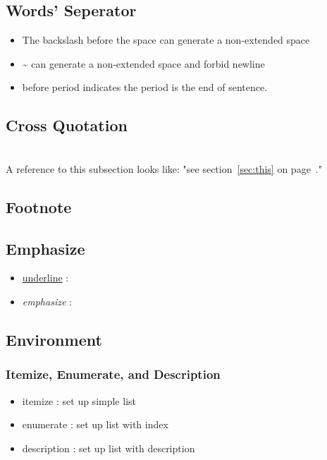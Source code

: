 \documentclass{article}
\begin{document}
\subsection{Words' Seperator}
\begin{itemize}
    \item The backslash before the space can
    generate a non-extended space 
    \item \~{} can generate a non-extended space
    and forbid newline
    \item {} before period
    indicates the period is the end of sentence.
\end{itemize}

\subsection{Cross Quotation}
\\
A reference to this subsection \label{sec:this}
looks like: "see section~\ref{sec:this} on
page~\pageref{sec:this}."

\subsection{Footnote}

\subsection{Emphasize}

\begin{itemize}
    \item \underline{underline}{} : 
    \item \emph{emphasize}{} : 
\end{itemize}

\subsection{Environment}

\subsubsection{Itemize, Enumerate, and Description}
\begin{itemize}
    \item itemize : set up simple list
    \item enumerate : set up list with index
    \item description : set up list with description
\end{itemize}
\end{document}
